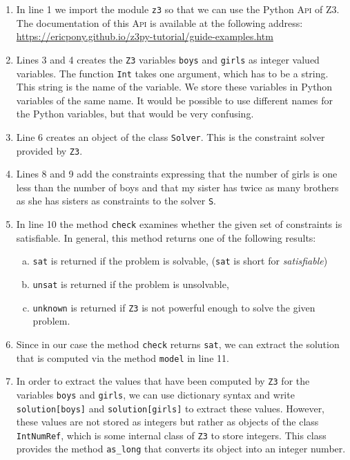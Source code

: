 \begin{enumerate}
\item In line 1 we import the module \texttt{z3} so that we can use the Python \textsc{Api} of Z3.
      The documentation of this \textsc{Api} is available at the following address:
      \\[0.2cm]
      \hspace*{1.3cm}
      \href{https://ericpony.github.io/z3py-tutorial/guide-examples.htm}{https://ericpony.github.io/z3py-tutorial/guide-examples.htm}
\item Lines 3 and 4 creates the \texttt{Z3} variables \texttt{boys} and \texttt{girls} as integer valued variables.
      The function \texttt{Int} takes one argument, which has to be a string.  This string is the name of the
      variable.  We store these variables in Python variables of the same name.  It would be possible to use
      different names for the Python variables, but that would be very confusing.
\item Line 6 creates an object of the class \texttt{Solver}.  This is the constraint solver provided by
      \texttt{Z3}.
\item Lines 8 and 9 add the constraints expressing that the number of girls is one less than the number of boys
      and that my sister has twice as many brothers as she has sisters as constraints to the solver \texttt{S}. 
\item In line 10 the method \texttt{check} examines whether the given set of constraints is satisfiable.
      In general, this method returns one of the following results:
      \begin{enumerate}[(a)]
      \item \texttt{sat} is returned if the problem is solvable, (\texttt{sat} is short for \emph{satisfiable})
      \item \texttt{unsat} is returned if the problem is unsolvable,
      \item \texttt{unknown} is returned if \texttt{Z3} is not powerful enough to solve the given problem.
      \end{enumerate}
\item Since in our case the method \texttt{check} returns \texttt{sat}, we can extract the solution that is
      computed via the method \texttt{model} in line 11.  
\item In order to extract the values that have been computed by \texttt{Z3} for the variables \texttt{boys} and
      \texttt{girls}, we can use dictionary syntax and write \texttt{solution[boys]} and
      \texttt{solution[girls]} to extract these values.  However, these values are not stored as integers but
      rather as objects of the class \texttt{IntNumRef}, which is some internal class of \texttt{Z3} to store
      integers.  This class provides the method \texttt{as\_long} that converts its object into an integer number.
\end{enumerate}

